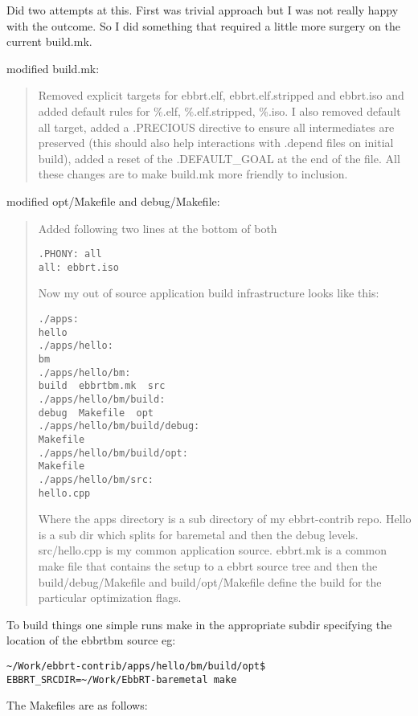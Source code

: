 \documentclass[11pt]{report}
\begin{document}
Did two attempts at this.  First was trivial approach but I was not really happy with the outcome.  So I did something that required a little more surgery on the current build.mk.
\begin{enumerate}
\item modified build.mk:
\begin{quotation}
Removed explicit targets for ebbrt.elf, ebbrt.elf.stripped and ebbrt.iso and added default rules for \%.elf, \%.elf.stripped, \%.iso.  I also removed default all target, added a .PRECIOUS directive to ensure all intermediates are preserved (this should also help
interactions with .depend files on initial build), added a reset of the .DEFAULT\_GOAL at the end of the file.  All these changes are to make build.mk more friendly to inclusion.   
\end{quotation}
\item modified opt/Makefile and debug/Makefile:
\begin{quotation}
Added following two lines at the bottom of both
\begin{verbatim}
.PHONY: all
all: ebbrt.iso
\end{verbatim}
\item Now my out of source application build infrastructure looks like this:
\begin{verbatim}
./apps:
hello
./apps/hello:
bm
./apps/hello/bm:
build  ebbrtbm.mk  src
./apps/hello/bm/build:
debug  Makefile  opt
./apps/hello/bm/build/debug:
Makefile
./apps/hello/bm/build/opt:
Makefile
./apps/hello/bm/src:
hello.cpp
\end{verbatim}
Where the apps directory is a sub directory of my ebbrt-contrib repo. Hello is a sub dir which splits for baremetal and then the debug levels.  src/hello.cpp is my common application source.  ebbrt.mk is a common make file that contains the setup to a ebbrt source tree and then the build/debug/Makefile and build/opt/Makefile define the build for the particular optimization flags.
\end{quotation}
\end{enumerate}
To build things one simple runs make in the appropriate subdir specifying the location of the ebbrtbm source eg:
{\tiny
\begin{verbatim}
~/Work/ebbrt-contrib/apps/hello/bm/build/opt$ EBBRT_SRCDIR=~/Work/EbbRT-baremetal make
\end{verbatim}
}
\newpage
The Makefiles are as follows:
\end{document}

